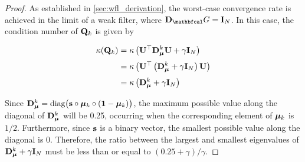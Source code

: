 \begin{proof}
    As established in \cref{sec:wfl_derivation}, the worst-case convergence rate is achieved in the limit of a weak filter, where $\D_\Gt = \I_N$. In this case, the condition number of $\mathbf{Q}_k$ is given by 

    \begin{align*}
        \kappa(\mathbf{Q}_k) &= \kappa\left( \mathbf{U}^\top \mathbf{D}_{\boldsymbol{\mu}}^k \mathbf{U} + \gamma \mathbf{I}_N\right) \\[0.1cm]
        &=  \kappa\left( \mathbf{U}^\top \left(\mathbf{D}_{\boldsymbol{\mu}}^k + \gamma \mathbf{I}_N\right) \mathbf{U}  \right) \\[0.1cm]
        &= \kappa\left( \mathbf{D}_{\boldsymbol{\mu}}^k + \gamma \mathbf{I}_N\right)
    \end{align*}

    Since $\mathbf{D}_{\boldsymbol{\mu}}^k = \text{diag}\big(\mathbf{s} \circ \boldsymbol{\mu}_k \circ (\mathbf{1} - \boldsymbol{\mu}_k)\big)$, the maximum possible value along the diagonal of $\mathbf{D}_{\boldsymbol{\mu}}^k$ will be 0.25, occurring when the corresponding element of $\boldsymbol{\mu}_k$ is $1/2$. Furthermore, since $\mathbf{s}$ is a binary vector, the smallest possible value along the diagonal is 0. Therefore, the ratio between the largest and smallest eigenvalues of $ \mathbf{D}_{\boldsymbol{\mu}}^k + \gamma \mathbf{I}_N$ must be less than or equal to $(0.25 + \gamma) / \gamma$. 
\end{proof}



